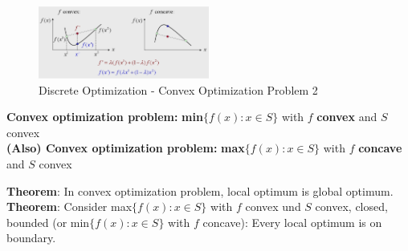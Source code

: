 \begin{figure}[H]
\centering
\includegraphics[width=0.5\textwidth]{figures/convexOptimization2.png}
\caption{Discrete Optimization - Convex Optimization Problem 2}
\end{figure}

\textbf{Convex optimization problem:} \textbf{min}$\{f(x): x \in S\}$ with $f$ \textbf{convex} and $S$ convex \\
\textbf{(Also) Convex optimization problem:} \textbf{max}$\{f(x): x \in S\}$ with $f$ \textbf{concave} and $S$ convex

\begin{tcolorbox}[colback=red!5!white,colframe=red!75!black]
\textbf{Theorem}: In convex optimization problem, local optimum is global optimum.\\
\textbf{Theorem}: Consider max$\{f(x) : x \in S\}$ with $f$ convex und $S$ convex, closed, bounded (or min$\{f(x): x \in S \}$ with $f$ concave): Every local optimum is on boundary.
\end{tcolorbox}



\clearpage